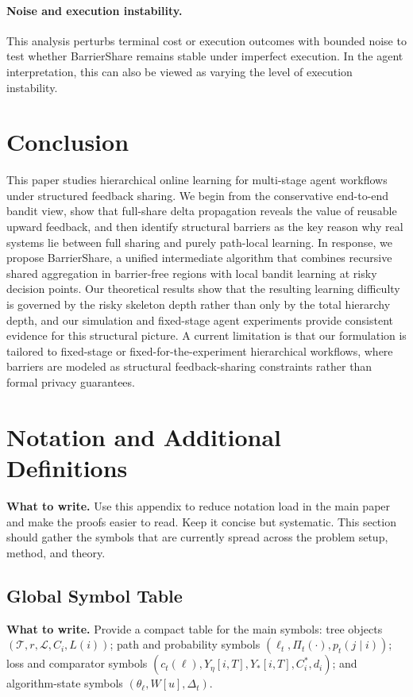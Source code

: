 \documentclass{article}
\newcommand{\towrite}[1]{\noindent\textbf{What to write.} #1}
\begin{document}
\paragraph{Noise and execution instability.}
This analysis perturbs terminal cost or execution outcomes with bounded noise to test whether BarrierShare remains stable under imperfect execution. In the agent interpretation, this can also be viewed as varying the level of execution instability.
\section{Conclusion}

This paper studies hierarchical online learning for multi-stage agent workflows under structured feedback sharing. We begin from the conservative end-to-end bandit view, show that full-share delta propagation reveals the value of reusable upward feedback, and then identify structural barriers as the key reason why real systems lie between full sharing and purely path-local learning. In response, we propose BarrierShare, a unified intermediate algorithm that combines recursive shared aggregation in barrier-free regions with local bandit learning at risky decision points. Our theoretical results show that the resulting learning difficulty is governed by the risky skeleton depth rather than only by the total hierarchy depth, and our simulation and fixed-stage agent experiments provide consistent evidence for this structural picture. A current limitation is that our formulation is tailored to fixed-stage or fixed-for-the-experiment hierarchical workflows, where barriers are modeled as structural feedback-sharing constraints rather than formal privacy guarantees.
\section{Notation and Additional Definitions}

\towrite{Use this appendix to reduce notation load in the main paper and make the proofs easier to read. Keep it concise but systematic. This section should gather the symbols that are currently spread across the problem setup, method, and theory.}

\subsection{Global Symbol Table}

\towrite{Provide a compact table for the main symbols: tree objects $(\mathcal{T}, r, \mathcal{L}, C_i, L(i))$; path and probability symbols $(\ell_t, \Pi_t(\cdot), p_t(j \mid i))$; loss and comparator symbols $(c_t(\ell), Y_\eta[i,T], Y_\ast[i,T], C_i^\ast, d_i)$; and algorithm-state symbols $(\theta_\ell, W[u], \Delta_t)$.}
\end{document}
